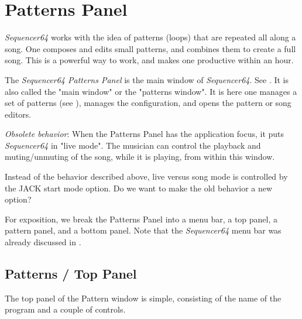 %
%
%

\section{Patterns Panel}
\label{sec:seq64_patterns_panel}

   \textsl{Sequencer64} works with the idea of patterns (loops) that are
   repeated all along a song.  One composes and edits small patterns, and
   combines them to create a full song.  This is a powerful way to work, and
   makes one productive within an hour.

   The \textsl{Sequencer64 Patterns Panel} is the main window of
   \textsl{Sequencer64}.
   See .
   It is also called the "main window" or the "patterns window".
   It is here one manages a set of patterns
   (see ),
   manages the configuration, and opens the pattern or song editors.

   \textsl{Obsolete behavior}:
   When the Patterns Panel has the application focus, it puts
   \textsl{Sequencer64} in "live mode".  The musician can
   control the playback and muting/unmuting of the song, while it is
   playing, from within this window.

   Instead of the behavior described above, live versus song mode is controlled
   by the JACK start mode option.  Do we want to make the old behavior a new
   option?

   For exposition, we break the Patterns Panel
   into a menu bar, a top panel, a pattern panel, and a
   bottom panel.  Note that the \textsl{Sequencer64} menu bar was
   already discussed in
   .

\subsection{Patterns / Top Panel}
\label{subsec:seq64_patterns_panel_top}

   The top panel of the Pattern window is simple, consisting of the name of
   the program and a couple of controls.

